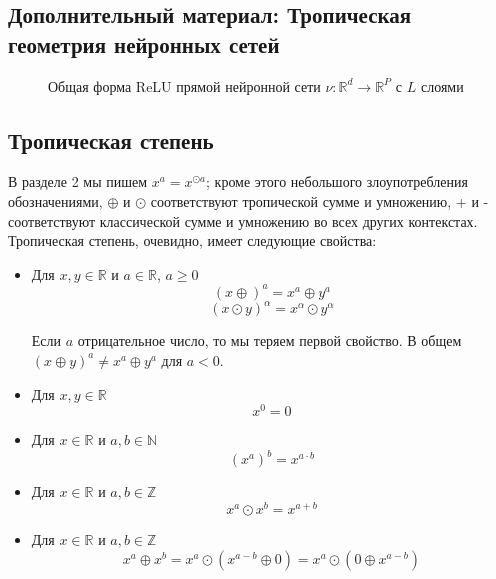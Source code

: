 \documentclass[russian]{lecture-notes}
\begin{document}
	\subsection{Дополнительный материал: Тропическая геометрия нейронных сетей}
	\begin{figure}[h]
		\caption{Общая форма ReLU прямой нейронной сети $\nu:\mathbb{R}^d \rightarrow \mathbb{R}^P$ с $L$ слоями}
	\end{figure}

	\newpage
	\subsection{Тропическая степень}
	
	В разделе 2 мы пишем $x^a = x^{\odot a}$; кроме этого небольшого злоупотребления обозначениями, $\oplus$ и $\odot$ соответствуют тропической сумме и умножению, + и - соответствуют классической сумме и умножению во всех других контекстах. Тропическая степень, очевидно, имеет следующие свойства: 
	\begin{itemize}
		\item Для $x, y \in \mathbb{R}$ и $a \in \mathbb{R}$, $a \geq 0$
		\[
			(x \oplus)^a = x^a \oplus y^a
		\]
		\[
			(x \odot y)^\alpha = x^\alpha \odot y^\alpha
		\]
		
		Если $a$ отрицательное число, то мы теряем первой свойство. В общем $(x \oplus y)^a \ne x^a \oplus y^a$ для $a < 0$. 
		\item Для $x,y \in \mathbb{R}$
		\[
			x^0 = 0
		\]
		\item Для $x \in \mathbb{R}$ и $a,b \in \mathbb{N}$
		\[
			(x^a)^b = x^{a\cdot b}
		\]
		\item Для $x \in \mathbb{R}$ и $a,b \in \mathbb{Z}$
		\[
			x^a \odot x^b = x^{a+b}
		\]
		\item Для $x \in \mathbb{R}$ и $a,b \in \mathbb{Z}$
		\[
			x^a \oplus x^b = x^a \odot(x^{a-b}\oplus 0) = x^a \odot (0\oplus x^{a-b})
		\]
	\end{itemize}
\end{document}
